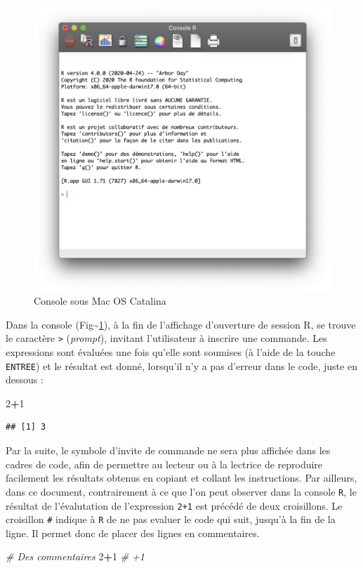 \documentclass[
  11pt,
]{book}
\newenvironment{Shaded}{\begin{snugshade}}{\end{snugshade}}
\newcommand{\CommentTok}[1]{\textcolor[rgb]{0.56,0.35,0.01}{\textit{#1}}}
\newcommand{\DecValTok}[1]{\textcolor[rgb]{0.00,0.00,0.81}{#1}}
\newcommand{\OperatorTok}[1]{\textcolor[rgb]{0.81,0.36,0.00}{\textbf{#1}}}
\numberwithin{equation}{section}
\numberwithin{countremarque}{section}
\begin{document}
\begin{figure}[H]

{\centering \includegraphics[width=0.4\linewidth]{figs/console_mac} 

}

\caption{Console sous Mac OS Catalina}\label{fig:intro-console}
\end{figure}

Dans la console (Fig\textasciitilde\ref{fig:intro-console}), à la fin de l'affichage d'ouverture de session R, se trouve le caractère \texttt{\textgreater{}} (\emph{prompt}), invitant l'utilisateur à inscrire une commande. Les expressions sont évaluées une fois qu'elle sont soumises (à l'aide de la touche \texttt{ENTREE}) et le résultat est donné, lorsqu'il n'y a pas d'erreur dans le code, juste en dessous :

\begin{Shaded}
\begin{Highlighting}[]
\DecValTok{2}\OperatorTok{+}\DecValTok{1}
\end{Highlighting}
\end{Shaded}

\begin{lstlisting}
## [1] 3
\end{lstlisting}

Par la suite, le symbole d'invite de commande ne sera plus affichée dans les cadres de code, afin de permettre au lecteur ou à la lectrice de reproduire facilement les résultats obtenus en copiant et collant les instructions. Par ailleurs, dans ce document, contrairement à ce que l'on peut observer dans la console \texttt{R}, le résultat de l'évalutation de l'expression \texttt{2+1} est précédé de deux croisillons. Le croisillon \texttt{\#} indique à \texttt{R} de ne pas evaluer le code qui suit, jusqu'à la fin de la ligne. Il permet donc de placer des lignes en commentaires.

\begin{Shaded}
\begin{Highlighting}[]
\CommentTok{\# Des commentaires}
\DecValTok{2}\OperatorTok{+}\DecValTok{1} \CommentTok{\# +1}
\end{Highlighting}
\end{Shaded}
\end{document}
